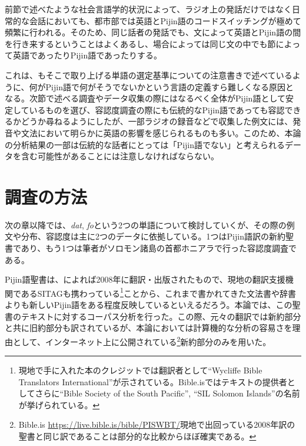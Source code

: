前節で述べたような社会言語学的状況によって、ラジオ上の発話だけではなく日常的な会話においても、都市部では英語とPijin語のコードスイッチングが極めて頻繁に行われる。そのため、同じ話者の発話でも、文によって英語とPijin語の間を行き来するということはよくあるし、場合によっては同じ文の中でも節によって英語であったりPijin語であったりする。

これは、\cite{dictionary}もそこで取り上げる単語の選定基準についての注意書きで述べているように、何がPijin語で何がそうでないかという言語の定義すら難しくなる原因となる。次節で述べる調査やデータ収集の際にはなるべく全体がPijin語として安定しているものを選び、容認度調査の際にも伝統的なPijin語であっても容認できるかどうか尋ねるようにしたが、一部ラジオの録音などで収集した例文には、発音や文法において明らかに英語の影響を感じられるものも多い。このため、本論の分析結果の一部は伝統的な話者にとっては「Pijin語でない」と考えられるデータを含む可能性があることには注意しなければならない。

\section{調査の方法}\label{sec:howexamined}
次の章以降では、\textit{dat}, \textit{fo}という2つの単語について検討していくが、その際の例文や分布、容認度は主に2つのデータに依拠している。1つはPijin語訳の新約聖書であり、もう1つは筆者がソロモン諸島の首都ホニアラで行った容認度調査である。

Pijin語聖書は、\cite{solomontimes}によれば2008年に翻訳・出版されたもので、現地の翻訳支援機関であるSITAGも携わっている\footnote{現地で手に入れた本のクレジットでは翻訳者として``Wycliffe Bible Translators International''が示されている。Bible.isではテキストの提供者としてさらに``Bible Society of the South Pacific'', ``SIL Solomon Islands''の名前が挙げられている。}ことから、これまで書かれてきた文法書や辞書よりも新しいPijin語をある程度反映しているといえるだろう。本論では、この聖書のテキストに対するコーパス分析を行った。この際、元々の翻訳では新約部分と共に旧約部分も訳されているが、本論においては計算機的な分析の容易さを理由として、インターネット上に公開されている\footnote{Bible.is \url{https://live.bible.is/bible/PISWBT/}現地で出回っている2008年訳の聖書と同じ訳であることは部分的な比較からほぼ確実である。}新約部分のみを用いた。

